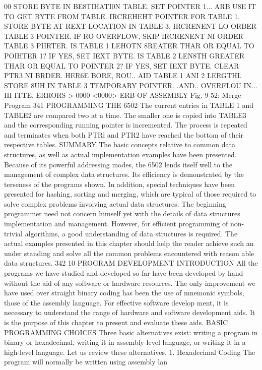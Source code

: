 {{{{{{{{{{{{{{{{{{{{{{{{{{{{{{{{{{{{{{{{{{{{{{{{{{{{{{{{{{{{{{{{{{{{{{{{{{{{{{{{{{{{{{{{{{{{{{{{{{{{{{{{{{{{{{{{{{{{{{{{00 STORE BYTE IN BE8TIHATI0N TABLE.
{SET POINTER 1...
{ARB U8E IT TO GET BYTE FROM TABLE.
{IRCREHEHT POINTER FOR TABLE 1.
{STORE BYTE AT REXT LOCATION IN TABLE 3.
{IRCRENENT LO ORBER TABLE 3 POINTER.
{IF RO OVERFLOW, SKIP
{IRCRENENT NI ORDER TABLE 3 PIIRTER.
{IS TABLE 1 LEHOTN 8REATER
{THAR OR EQUAL TO POIHTER 1?
{IF YES, SET IEXT BYTE.
{IS TABLE 2 LEN8TH GREATER
{THAR OR EQUAL TO POINTER 2?
{IF YES, SET IEXT BYTE.
{CLEAR PTR3 NI BRDER.
{HER6E BORE, ROU..
{AID TABLE 1 ANI 2 LERGTHI.
{STORE 8UH IN TABLE 3 TEMPORARY POINTER.
.{AND..
{OVERFLOU IN...
{HI ITTE.
ERRORS > 0000 <0000>
ERB OF ASSEMBLY
Fig. 9-52: Merge Program
341
PROGRAMMING THE 6502
The current entries in TABLE 1 and TABLE2 are compared two
at a time. The smaller one is copied into TABLE3 and the corresponding
running pointer is incremented. The process is repeated and terminates
when both PTRl and PTR2 have reached the bottom of their respective
tables.
SUMMARY
The basic concepts relative to common data structures, as well
as actual implementation examples have been presented.
Because of its powerful addressing modes, the 6502 lends itself
well to the management of complex data structures. Its efficiency
is demonstrated by the terseness of the programs shown.
In addition, special techniques have been presented for hashing,
sorting and merging, which are typical of those required to solve
complex problems involving actual data structures.
The beginning programmer need not concern himself yet with
the details of data structures implementation and management.
However, for efficient programming of non-trivial algorithms, a good
understanding of data structures is required. The actual examples
presented in this chapter should help the reader achieve such an under
standing and solve all the common problems encountered with reason
able data structures.
342
10
PROGRAM DEVELOPMENT
INTRODUCTION
All the programs we have studied and developed so far have
been developed by hand without the aid of any software or
hardware resources. The only improvement we have used over
straight binary coding has been the use of mnemonic symbols,
those of the assembly language. For effective software develop
ment, it is necessary to understand the range of hardware and
software development aids. It is the purpose of this chapter to
present and evaluate these aids.
BASIC PROGRAMMING CHOICES
Three basic alternatives exist: writing a program in binary or
hexadecimal, writing it in assembly-level language, or writing it
in a high-level language. Let us review these alternatives.
1. Hexadecimal Coding
The program will normally be written using assembly lan
}}}}}}}}}}}}}}}}}}}}}}}}}}}}}}}}}}}}}}}}}}}}}}}}}}}}}}}}}}}}}}}}}}}}}}}}}}}}}}}}}}}}}}}}}}}}}}}}}}}}}}}}}}}}}}}}}}}}}}}}}}}}}}}}}}}}}}}}}}}}
